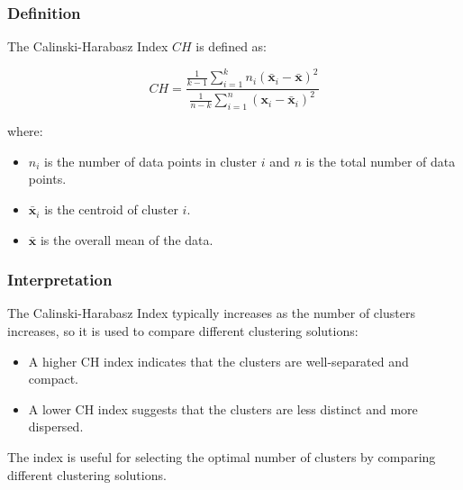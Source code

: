\subsubsection*{Definition}
The Calinski-Harabasz Index \(CH\) is defined as:

\[
CH = \dfrac{ \frac{1}{k-1} \sum_{i=1}^{k} n_i (\mathbf{\bar{x}}_i - \mathbf{\bar{x}})^2 }{ \frac{1}{n-k} \sum_{i=1}^{n} (\mathbf{x}_i - \mathbf{\bar{x}}_i)^2 }
\]

where:
\begin{itemize}
    \item \(n_i\) is the number of data points in cluster \(i\) and \(n\) is the total number of data points.
    \item \(\mathbf{\bar{x}}_i\) is the centroid of cluster \(i\).
    \item \(\mathbf{\bar{x}}\) is the overall mean of the data.
\end{itemize}

\subsubsection*{Interpretation}
The Calinski-Harabasz Index typically increases as the number of clusters increases, so it is used to compare different clustering solutions:
\begin{itemize}
    \item A higher CH index indicates that the clusters are well-separated and compact.
    \item A lower CH index suggests that the clusters are less distinct and more dispersed.
\end{itemize}

The index is useful for selecting the optimal number of clusters by comparing different clustering solutions.



\clearpage